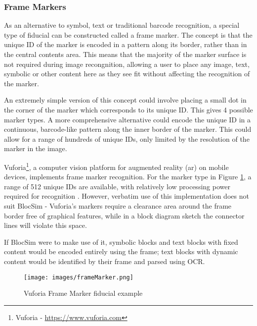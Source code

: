 
\subsubsection{Frame Markers}
\label{ch:back:borders}

As an alternative to symbol, text or traditional barcode recognition, a special type of fiducial can be constructed called a frame marker. The concept is that the unique ID of the marker is encoded in a pattern along its border, rather than in the central contents area. This means that the majority of the marker surface is not required during image recongnition, allowing a user to place any image, text, symbolic or other content here as they see fit without affecting the recognition of the marker.

An extremely simple version of this concept could involve placing a small dot in the corner of the marker which corresponds to its unique ID. This gives 4 possible marker types. A more comprehensive alternative could encode the unique ID in a continuous, barcode-like pattern along the inner border of the marker. This could allow for a range of hundreds of unique IDs, only limited by the resolution of the marker in the image.

Vuforia\footnote{Vuforia - \url{https://www.vuforia.com}}, a computer vision platform for augmented reality (\gls{ar}) on mobile devices, implements frame marker recognition. For the marker type in Figure \ref{im:frameMarker}, a range of 512 unique IDs are available, with relatively low processing power required for recognition \cite{vuforia}. However, verbatim use of this implementation does not suit BlocSim - Vuforia's markers require a clearance area around the frame border free of graphical features, while in a block diagram sketch the connector lines will violate this space.

If BlocSim were to make use of it, symbolic blocks and text blocks with fixed content would be encoded entirely using the frame; text blocks with dynamic content would be identified by their frame and parsed using OCR.

\begin{figure}[ht!]
\centering
\texttt{[image: images/frameMarker.png]}
\caption{Vuforia Frame Marker fiducial example \cite{vuforia}}
\label{im:frameMarker}
\end{figure}

